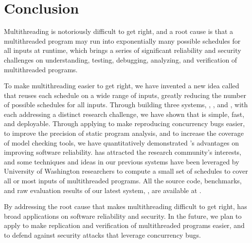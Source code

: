 \chapter{Conclusion} \label{sec:conclusion}

Multithreading is notoriously difficult to get right, and a root cause is that 
a multithreaded program may run into exponentially many
possible schedules for all inputs at runtime, which brings a series of
significant reliability and security challenges on understanding,
testing, debugging, analyzing, and verification of multithreaded
programs.

To make multithreading easier to get right, we have invented a new idea called 
\smt that reuses each schedule on a wide range of inputs,
greatly reducing the number of possible schedules for all inputs. Through
building three \smt systems, \tern, \peregrine, and \parrot, with each 
addressing a distinct research challenge, we have shown that \smt is 
simple, fast, and deployable. Through applying \smt to make reproducing 
concurrency bugs easier, to improve the precision of static program analysis, 
and to increase the coverage of model checking tools, we have quantitatively 
demonstrated \smt's advantages on improving software reliability. \smt has 
attracted the research community's interests, and some techniques and ideas in 
our previous systems have been leveraged by University of Washington 
researchers to compute a small set of schedules to cover all or most inputs of 
multithreaded programs. All the source code, benchmarks, and raw evaluation 
results of our latest \smt system, \parrot, are available at \github.

By addressing the root cause that makes multithreading difficult to get right,
\smt has broad applications on software reliability and security. In the 
future, we plan to apply \smt to make replication and verification of 
multithreaded programs easier, and to defend against security attacks 
that leverage concurrency bugs.